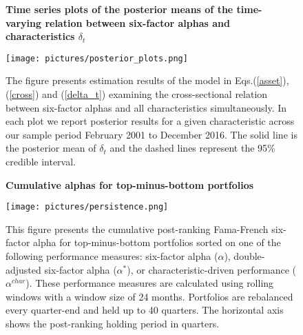 \begin{singlespacing}
\begin{figure}[H]
\centering
  \captionsetup{justification=left}
    {\captionsetup{justification=centering,singlelinecheck=off}
\caption{\bfseries Time series plots of the posterior means of the time-varying relation between six-factor alphas and characteristics $\delta_t$} \label{figure1} } 
\caption*{The figure presents estimation results of the model in Eqs.(\ref{asset}), (\ref{cross}) and (\ref{delta_t}) examining the cross-sectional relation between six-factor alphas and all characteristics simultaneously. In each plot we report posterior results for a given characteristic across our sample period February 2001 to December 2016. The solid line is the posterior mean of $\delta_t$ and the dashed lines represent the 95\% credible interval.}
  \texttt{[image: pictures/posterior\_plots.png]}

\end{figure}
\end{singlespacing}

\begin{singlespacing}
\begin{figure}[H]
\centering
  \captionsetup{justification=left}
  {\captionsetup{justification=centering,singlelinecheck=off}
  \caption{\bfseries Cumulative alphas for top-minus-bottom portfolios }\label{figure2} } 
\caption*{This figure presents the cumulative post-ranking Fama-French six-factor alpha for top-minus-bottom portfolios sorted on one of the following performance measures: six-factor alpha ($\alpha$), double-adjusted six-factor alpha ($\alpha^*$), or characteristic-driven performance ($\alpha^{char}$). These performance measures are calculated using rolling windows with a window size of 24 months. Portfolios are rebalanced every quarter-end and held up to 40 quarters. The horizontal axis shows the post-ranking holding period in quarters.}
  \texttt{[image: pictures/persistence.png]}

\end{figure}
\end{singlespacing}
